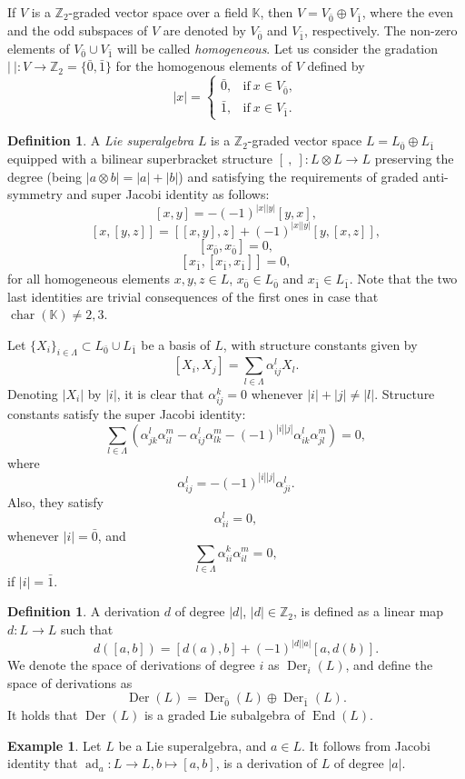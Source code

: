 \documentclass[reqno]{amsart}
\theoremstyle{definition}
\newtheorem{definition}[theorem]{Definition}
\newtheorem{example}[theorem]{Example}
\theoremstyle{remark}
\numberwithin{equation}{section}
\DeclareMathOperator{\ad}{ad}
\DeclareMathOperator{\chr}{char}
\DeclareMathOperator{\Der}{Der}
\DeclareMathOperator{\End}{End}
\begin{document}
If $V$ is a $\mathbb{Z}_2$-graded vector space over a field $\mathbb{K}$, then $V=V_{\bar{0}} \oplus V_{\bar{1}}$, where the even and the odd subspaces of $V$ are denoted by $V_{\bar{0}}$ and   $V_{\bar{1}}$, respectively. The non-zero elements of $V_{\bar{0}} \cup V_{\bar{1}}$ will be called \emph{homogeneous}. Let us consider the gradation $|\ | \colon V \to \mathbb{Z}_2=\{\bar{0},\bar{1}\}$ for the homogenous elements of $V$ defined by
\[
  |x|=\begin{cases}
    \bar{0}, & \text{if} \ x \in V_{\bar{0}},\\
    \bar{1}, & \text{if} \  x \in V_{\bar{1}}.
  \end{cases}
\]
\begin{definition}
A \emph{Lie superalgebra} $L$ is a $\mathbb{Z}_2$-graded vector space $L=L_{\bar{0}}\oplus L_{\bar{1}}$ equipped with a bilinear superbracket structure $[~,~] \colon L \otimes L \to L$ preserving the degree (being $|a\otimes b|=|a|+|b|$) and satisfying the requirements of graded anti-symmetry and super Jacobi identity as follows:
\[[x,y]=-(-1)^{{|x|}{|y|}} [y,x], \]
\[[x,[y,z]]=[[x,y],z]+ (-1)^{{|x|}{|y|}} [y,[x,z]] ,\]
\[ [x_{\bar{0}}, x_{\bar{0}} ]=0,\]
\[[x_{\bar{1}},[x_{\bar{1}}, x_{\bar{1}} ]]=0,\]
for all homogeneous elements $x,y,z \in L$, $x_{\bar{0}} \in L_{\bar{0}}$ and $x_{\bar{1}} \in L_{\bar{1}}$. Note that the two last identities are trivial consequences of the first ones in case that $\chr(\mathbb{K})\neq 2,3$.
\end{definition}
 Let $\{X_i\}_{i\in\Lambda} \subset L_{\bar{0}}\cup L_{\bar{1}} $ be a basis of $L$, with structure constants given by
\[ [X_i,X_j]=\sum_{l\in\Lambda} \alpha_{ij}^{l} X_l .\]
Denoting $|X_i|$ by $|i|$, it is clear that $\alpha_{ij}^{k}=0$ whenever $|i|+|j| \neq |l|$. Structure constants satisfy the super Jacobi identity:
\begin{equation}\label{jacobi}
\sum_{l\in\Lambda}(\alpha_{jk}^l\alpha_{il}^{m}-\alpha_{ij}^l\alpha_{lk}^{m}-(-1)^{|i||j|}\alpha_{ik}^l\alpha_{jl}^{m})=0,
\end{equation}
where
\[ \alpha_{ij}^{l}= - (-1) ^{|i| |j|} \alpha_{ji}^{l}.\]
Also, they satisfy
\[\alpha_{ii}^l=0,\]
whenever $|i|=\bar{0}$, and
\[\sum_{l\in\Lambda}\alpha_{ii}^k\alpha_{il}^m=0,\]
if $|i|=\bar{1}$.
\begin{definition}
A derivation $d$ of degree $|d|$, $|d| \in \mathbb{Z}_2$, is defined as a linear map $d \colon L \to L$ such that
\[ d([a,b])=[d(a),b]+(-1)^{|d| |a|} [a,d(b)] .\]
We denote the space of derivations of degree $i$ as $\Der_i(L)$, and define the space of derivations as \[\Der(L)=\Der_{\bar{0}}(L)\oplus\Der_{\bar{1}}(L).\]
It holds that $\Der(L)$ is a graded Lie subalgebra of $\End(L)$.
\end{definition}
\begin{example}
Let $L$ be a Lie superalgebra, and $a\in L$. It follows from Jacobi identity that $\ad_a \colon L \to L, b \mapsto [a,b]$, is a derivation of $L$ of degree $|a|$.
\end{example}
\end{document}
